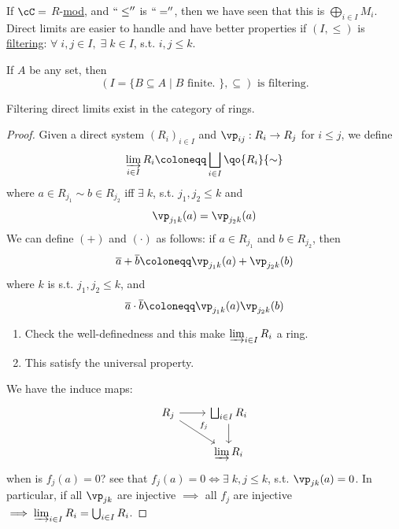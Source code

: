 \begin{eg}
	If \( \cC = \) \( R \)-\underline{mod}, and \( ``\leq''\) is \( ``='' \), then we have seen that
	this is \( \bigoplus_{i\in I} M_i \). Direct limits are easier to handle and have better
	properties if \( (I, \leq) \) is \underline{filtering}: \( \forall \; i,j \in I, \; \exists\; k
	\in I \), s.t. \( i,j \leq k \).
	\begin{eg}
		If \( A \) be any set, then
		\[
			(I = \{B \subseteq A \; | \; B \text{ finite. }\}, \subseteq) \text{ is filtering.}
		\]
	\end{eg}
\end{eg}

\begin{proposition}
	Filtering direct limits exist in the category of rings.
\end{proposition}

\begin{proof}
	Given a direct system \( (R_i)_{i\in I} \) and \( \vp_{ij} : R_i \to R_j \) for \( i \leq j \), we
	define
	\[
		\varinjlim_{i\in I} R_i \coloneqq  \bigsqcup_{i\in I} \qo{R_i}{\sim}
	\]
	where \( a\in R_{j_1}\sim b \in R_{j_2} \)  iff \( \exists\; k \), s.t. \( j_1, j_2 \leq k \) and
	\[
		\vp_{j_1 k}(a) = \vp_{j_{2}k} (a)
	\]
	We can define \( (+) \) and \( (\cdot) \) as follows: if \( a\in R_{j_1} \) and \( b\in R_{j_2}
	\), then
	\[
		\overline{a} + \overline{b} \coloneqq \vp_{j_1 k} (a) + \vp_{j_2 k} (b)
	\]
	where \( k\) is s.t. \( j_1, j_2 \leq k \), and
	\[
		\overline{a} \cdot \overline{b} \coloneqq \vp_{j_1 k} (a) \vp_{j_2 k} (b)
	\]
	\begin{exercise}
		\leavevmode
		\begin{enumerate}
			\item Check the well-definedness and this make \( \varinjlim_{i\in I} R_i \) a ring.
			\item This satisfy the universal property.
		\end{enumerate}
	\end{exercise}
	We have the induce maps:
	\[
		\begin{tikzcd}
			R_j \arrow[r] \arrow[rd, "f_j"] & \bigsqcup_{i\in I} R_i \arrow[d]\\
			& \varinjlim R_i
		\end{tikzcd}
	\]
	when is \( f_j(a) = 0 \)? see that \( f_j (a) = 0 \iff \exists \; k, j \leq k \), s.t. \( \vp_{jk} (a) = 0 \). In particular,
	if all \( \vp_{jk} \) are injective \( \implies  \) all \( f_j \) are injective \( \implies
	\varinjlim_{i\in I} R_i = \bigcup_{i\in I} R_i \).
\end{proof}

